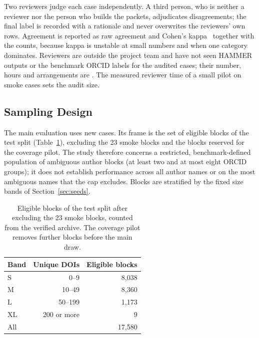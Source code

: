 Two reviewers judge each case independently. A third person, who is neither a reviewer nor the person who builds the packets, adjudicates disagreements; the final label is recorded with a rationale and never overwrites the reviewers' own rows. Agreement is reported as raw agreement and Cohen's kappa~\cite{cohen1960kappa} together with the counts, because kappa is unstable at small numbers and when one category dominates. Reviewers are outside the project team and have not seen HAMMER outputs or the benchmark ORCID labels for the audited cases; their number, hours and arrangements are . The measured reviewer time of a small pilot on smoke cases sets the audit size.

\subsection{Sampling Design}
\label{sec:sampling}
The main evaluation uses new cases. Its frame is the set of eligible blocks of the test split (Table~\ref{tab:frame}), excluding the 23 smoke blocks and the blocks reserved for the coverage pilot. The study therefore concerns a restricted, benchmark-defined population of ambiguous author blocks (at least two and at most eight ORCID groups); it does not establish performance across all author names or on the most ambiguous names that the cap excludes. Blocks are stratified by the fixed size bands of Section~\ref{sec:seeds}.

\begin{table}[t]
\caption{Eligible blocks of the test split after excluding the 23 smoke blocks, counted from the verified archive. The coverage pilot removes further blocks before the main draw.}
\label{tab:frame}
\centering
\footnotesize
\renewcommand{\arraystretch}{1.1}
\begin{tabular}{@{}lrr@{}}
\toprule
\textbf{Band} & \textbf{Unique DOIs} & \textbf{Eligible blocks} \\
\midrule
S & 0--9 & 8,038 \\
M & 10--49 & 8,360 \\
L & 50--199 & 1,173 \\
XL & 200 or more & 9 \\
\midrule
All & & 17,580 \\
\bottomrule
\end{tabular}
\end{table}

